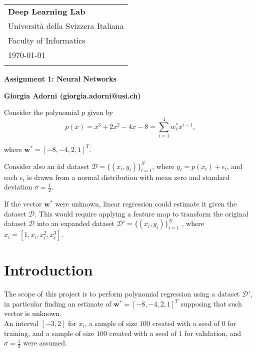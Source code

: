 \documentclass[a4paper,12pt]{article} %
\begin{document}
	

	\thispagestyle{empty}  
	
	\begin{tabular}{p{15.5cm}} 
		{\large \bf Deep Learning Lab} \\
		Università della Svizzera Italiana \\ Faculty of Informatics \\ \today  \\
		\hline
		\\
	\end{tabular} 
	
	\vspace*{0.3cm} 
	
	\begin{center}
		{\Large \bf Assignment 1: Neural Networks}
		\vspace{2mm}
		
		{\bf Giorgia Adorni (giorgia.adorni@usi.ch)}
		
	\end{center}  
	
	\vspace{0.4cm}
	
	
	
	Consider the polynomial $p$ given by
	\begin{equation*}
	p(x)=x^3+2x^2-4x-8=\sum_{i=1}^4 w_i^*x^{i-1} \mbox{,}
	\end{equation*} 
	
	where $\textbf{w}^*=[-8,-4,2,1]^T$.
	
	Consider also an iid dataset $\mathcal{D} = \{(x_i, y_i)\}^N_{i=1}$, where $y_i = p(x_i)+\epsilon_i$, and each $\epsilon_i$ is drawn from a normal distribution with mean zero and standard deviation $\sigma = \frac{1}{2}$.
	
	If the vector $\textbf{w}^*$ were unknown, linear regression could estimate it given the dataset $\mathcal{D}$. This would require applying a feature map to transform the
	original dataset $\mathcal{D}$ into an expanded dataset $\mathcal{D}'= \{(x_i, y_i)\}^N_{i=1}$ , where $x_i = [1,x_i,x_i^2,x_i^3]$.
	
	\section{Introduction}
	The scope of this {project} is to perform polynomial regression using a dataset $\mathcal{D}'$, in particular finding an estimate of $\textbf{w}^*=[-8,-4,2,1]^T$ supposing that such vector is unknown.\\
	An interval $[-3, 2]$ for $x_i$, a sample of size $100$ created with a seed of $0$ for training, and a sample of size $100$ created with a seed of $1$ for validation, and $\sigma = \frac{1}{2}$ were assumed.
	
\end{document}

